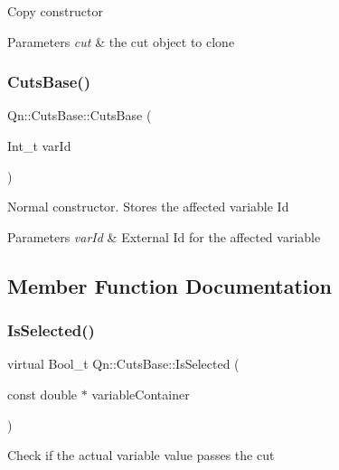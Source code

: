 Copy constructor 
\begin{DoxyParams}{Parameters}
{\em cut} & the cut object to clone \\
\hline
\end{DoxyParams}
\mbox{\label{classQn_1_1CutsBase_a0b506ca7d770a8d5991b7f22848e7b81}} 
\subsubsection{\texorpdfstring{Cuts\+Base()}{CutsBase()}\hspace{0.1cm}{\footnotesize\ttfamily [2/2]}}
{\footnotesize\ttfamily Qn\+::\+Cuts\+Base\+::\+Cuts\+Base (\begin{DoxyParamCaption}\item[{Int\+\_\+t}]{var\+Id }\end{DoxyParamCaption})}

Normal constructor. Stores the affected variable Id 
\begin{DoxyParams}{Parameters}
{\em var\+Id} & External Id for the affected variable \\
\hline
\end{DoxyParams}


\subsection{Member Function Documentation}
\mbox{\label{classQn_1_1CutsBase_aab081fa4220144505ca838539d83aa8d}} 
\subsubsection{\texorpdfstring{Is\+Selected()}{IsSelected()}}
{\footnotesize\ttfamily virtual Bool\+\_\+t Qn\+::\+Cuts\+Base\+::\+Is\+Selected (\begin{DoxyParamCaption}\item[{const double $\ast$}]{variable\+Container }\end{DoxyParamCaption})\hspace{0.3cm}{\ttfamily [pure virtual]}}

Check if the actual variable value passes the cut

